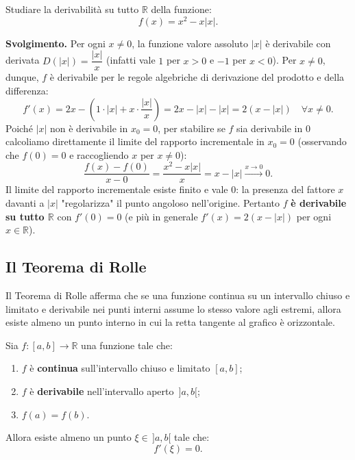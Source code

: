 \begin{esbox}[Esercizio svolto — Derivabilità di $f(x) = x^2 - x|x|$]
Studiare la derivabilità su tutto $\mathbb{R}$ della funzione:
\[
    f(x) = x^2 - x|x|.
\]

\medskip
\noindent\textbf{Svolgimento.}
Per ogni $x \neq 0$, la funzione valore assoluto $|x|$ è derivabile con derivata $D(|x|) = \dfrac{|x|}{x}$ (infatti vale $1$ per $x > 0$ e $-1$ per $x < 0$). Per $x \neq 0$, dunque, $f$ è derivabile per le regole algebriche di derivazione del prodotto e della differenza:
\[
    f'(x) = 2x - \left(1 \cdot |x| + x \cdot \frac{|x|}{x}\right) = 2x - |x| - |x| = 2(x - |x|) \quad \forall x \neq 0.
\]
Poiché $|x|$ non è derivabile in $x_0 = 0$, per stabilire se $f$ sia derivabile in $0$ calcoliamo direttamente il limite del rapporto incrementale in $x_0 = 0$ (osservando che $f(0) = 0$ e raccogliendo $x$ per $x \neq 0$):
\[
    \frac{f(x) - f(0)}{x - 0} = \frac{x^2 - x|x|}{x} = x - |x| \xrightarrow{x \to 0} 0.
\]
Il limite del rapporto incrementale esiste finito e vale $0$: la presenza del fattore $x$ davanti a $|x|$ "regolarizza" il punto angoloso nell'origine. Pertanto $f$ \textbf{è derivabile su tutto $\mathbb{R}$} con $f'(0) = 0$ (e più in generale $f'(x) = 2(x - |x|)$ per ogni $x \in \mathbb{R}$).
\end{esbox}

\subsection{Il Teorema di Rolle}

Il Teorema di Rolle afferma che se una funzione continua su un intervallo chiuso e limitato e derivabile nei punti interni assume lo stesso valore agli estremi, allora esiste almeno un punto interno in cui la retta tangente al grafico è orizzontale.

\begin{propbox}
Sia $f \colon [a,b] \to \mathbb{R}$ una funzione tale che:
\begin{enumerate}
    \item $f$ è \textbf{continua} sull'intervallo chiuso e limitato $[a,b]$;
    \item $f$ è \textbf{derivabile} nell'intervallo aperto $\,]a,b[$;
    \item $f(a) = f(b)$.
\end{enumerate}
Allora esiste almeno un punto $\xi \in \,]a,b[$ tale che:
\[
    f'(\xi) = 0.
\]
\end{propbox}

